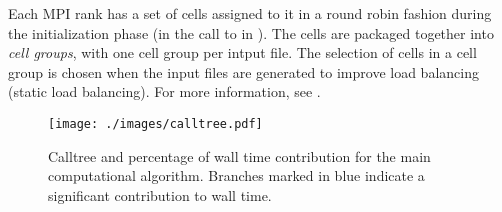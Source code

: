 Each MPI rank has a set of cells assigned to it in a round robin fashion during the initialization phase (in the call to  in ).
The cells are packaged together into \emph{cell groups}, with one cell group per intput file. The selection of cells in a cell group is chosen when the input files are generated to improve load balancing (static load balancing).
For more information, see .


%
%

\begin{figure}[htp!]
\centering
\texttt{[image: ./images/calltree.pdf]}
\caption{Calltree and percentage of wall time contribution for the main computational algorithm. Branches marked in blue indicate a significant contribution to wall time.}
\label{fig:calltree}
\end{figure}

